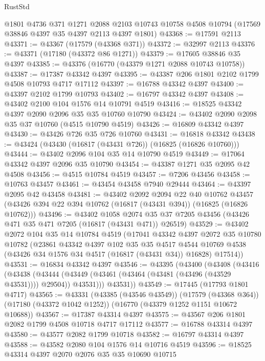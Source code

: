 \begin{lexlean}{RustStd}
\begin{coremodule}
{\begin{coremodule}
{{{{{{{{{{{{{{{{{{{{{{{{{{{{{{{{{{{{{{{{{{{{{{{{{{{{{{{    @1801
    @4736
    @371
    @1271
    @2088
    @2103
    @10743
    @10758
    @4508
    @10794
    (@17569 @38846 @4397 @35 @4397 @2113 @4397 @1801)
@43368 := @17591 @2113
@43371 := @43367 (@17579 (@43368 @371))
@43372 := @32997 @2113
@43376 := @43371 (@17180 (@43372 @86 @1271))
@43379 := @17605 @38846 @35 @4397
@43385 := @43376 (@16770 (@43379 @1271 @2088 @10743 @10758))
@43387 := @17387 @43342 @4397
@43395 := @43387 @206 @1801 @2102 @1799 @4508 @10793 @4717 @17112
@43397 := @16788 @43342 @4397
@43400 := @43397 @2102 @1799 @10793
@43402 := @16797 @43342 @4397
@43408 := @43402 @2100 @104 @1576 @14 @10791 @4519
@43416 := @18525 @43342 @4397 @2090 @2096 @35 @35 @10760 @10790
@43424 := @43402 @2090 @2098 @35 @37 @10760 (@4515 @10790 @4519)
@43426 := @16809 @43342 @4397
@43430 := @43426 @726 @35 @726 @10760
@43431 := @16818 @43342
@43438 := @43424 (@43430 (@16817 (@43431 @726)) (@16825 (@16826 @10760)))
@43444 := @43402 @2096 @104 @35 @14 @10790 @4519
@43449 := @17064 @43342 @4397 @2096 @35 @10790
@43454 := @43387 @1271 @35 @2095 @42 @4508
@43456 := @4515 @10784 @4519
@43457 := @7206 @43456
@43458 := @10763 @43457
@43461 := @43454 @43458 @7940 @29444
@43464 := @43397 @2095 @42 @43458
@43481 := @43402
    @2092
    @2094
    @22
    @40
    @10762
    @43457
    (@43426 @394 @22 @394 @10762 (@16817 (@43431 @394)) (@16825 (@16826 @10762)))
@43496 := @43402
    @1058
    @2074
    @35
    @37
    @7205
    @43456
    (@43426 @471 @35 @471 @7205 (@16817 (@43431 @471)) @26519)
@43529 := @43402
    @2072
    @104
    @35
    @14
    @10784
    @4519
    (@17041
      @43342
      @4397
      @2072
      @35
      @10780
      @10782
      (@23861
        @43342
        @4397
        @102
        @35
        @35
        @4517
        @4544
        @10769
        @4538
        (@43426 @34 @1576 @34 @4517 (@16817 (@43431 @34)) @16828)
        @17514))
@43531 := @16834 @43342 @4397
@43546 := @43395
    (@43400
      (@43408
        (@43416
          (@43438
            (@43444 (@43449 (@43461 (@43464 (@43481 (@43496 (@43529 @43531)))) @29504)) @43531)))
        @43531))
@43549 := @17445 (@17793 @1801 @4717)
@43565 := @43331
    (@43385 (@43546 @43549))
    (@17579 (@43368 @364))
    (@17180 (@43372 @1042 @1252))
    (@16770 (@43379 @1252 @1151 @10672 @10688))
@43567 := @17387 @43314 @4397
@43575 := @43567 @206 @1801 @2082 @1799 @4508 @10718 @4717 @17112
@43577 := @16788 @43314 @4397
@43580 := @43577 @2082 @1799 @10718
@43582 := @16797 @43314 @4397
@43588 := @43582 @2080 @104 @1576 @14 @10716 @4519
@43596 := @18525 @43314 @4397 @2070 @2076 @35 @35 @10690 @10715
}}}}}}}}}}}}}}}}}}}}}}}}}}}}}}}}}}}}}}}}}}}}}}}}}}}}}}}
\end{coremodule}}
\end{coremodule}
\end{lexlean}
